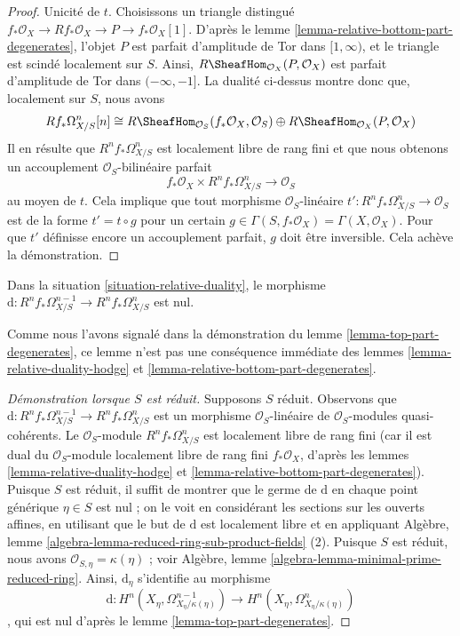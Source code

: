 \begin{proof}
\medskip\noindent
Unicité de $t$. Choisissons un triangle distingué
$f_*\mathcal{O}_X \to Rf_*\mathcal{O}_X \to P \to f_*\mathcal{O}_X[1]$.
D'après le lemme \ref{lemma-relative-bottom-part-degenerates},
l'objet $P$ est parfait d'amplitude de Tor dans $[1, \infty)$,
et le triangle est scindé localement sur $S$.
Ainsi, $R\SheafHom_{\mathcal{O}_X}(P, \mathcal{O}_X)$ est parfait
d'amplitude de Tor dans $(-\infty, -1]$. La dualité ci-dessus montre donc que,
localement sur $S$, nous avons
$$
Rf_*\Omega^n_{X/S}[n] \cong
R\SheafHom_{\mathcal{O}_S}(f_*\mathcal{O}_X, \mathcal{O}_S)
\oplus R\SheafHom_{\mathcal{O}_X}(P, \mathcal{O}_X)
$$
Il en résulte que $R^nf_*\Omega^n_{X/S}$ est localement libre de rang fini et
que nous obtenons un accouplement $\mathcal{O}_S$-bilinéaire parfait
$$
f_*\mathcal{O}_X \times R^nf_*\Omega^n_{X/S} \longrightarrow \mathcal{O}_S
$$
au moyen de $t$.
Cela implique que tout morphisme $\mathcal{O}_S$-linéaire
$t' : R^nf_*\Omega^n_{X/S} \to \mathcal{O}_S$ est de la forme
$t' = t \circ g$ pour un certain
$g \in \Gamma(S, f_*\mathcal{O}_X) = \Gamma(X, \mathcal{O}_X)$.
Pour que $t'$ définisse encore un accouplement parfait, $g$ doit
être inversible. Cela achève la démonstration.
\end{proof}

\begin{lemma}
\label{lemma-relative-top-part-degenerates}
Dans la situation \ref{situation-relative-duality}, le morphisme
$\text{d} : R^nf_*\Omega^{n - 1}_{X/S} \to R^nf_*\Omega^n_{X/S}$
est nul.
\end{lemma}

\noindent
Comme nous l'avons signalé dans la démonstration du lemme \ref{lemma-top-part-degenerates},
ce lemme n'est pas une conséquence immédiate des lemmes
\ref{lemma-relative-duality-hodge} et
\ref{lemma-relative-bottom-part-degenerates}.

\begin{proof}[Démonstration lorsque $S$ est réduit]
Supposons $S$ réduit. Observons que
$\text{d} : R^nf_*\Omega^{n - 1}_{X/S} \to R^nf_*\Omega^n_{X/S}$
est un morphisme $\mathcal{O}_S$-linéaire de $\mathcal{O}_S$-modules quasi-cohérents.
Le $\mathcal{O}_S$-module $R^nf_*\Omega^n_{X/S}$ est localement libre de rang fini
(car il est dual du $\mathcal{O}_S$-module localement libre de rang fini
$f_*\mathcal{O}_X$, d'après les lemmes
\ref{lemma-relative-duality-hodge} et
\ref{lemma-relative-bottom-part-degenerates}).
Puisque $S$ est réduit, il suffit de montrer que
le germe de $\text{d}$ en chaque point générique $\eta \in S$
est nul ; on le voit en considérant les sections sur les ouverts affines,
en utilisant que le but de $\text{d}$ est localement libre et en appliquant
Algèbre, lemme \ref{algebra-lemma-reduced-ring-sub-product-fields} (2).
Puisque $S$ est réduit, nous avons $\mathcal{O}_{S, \eta} = \kappa(\eta)$ ; voir
Algèbre, lemme \ref{algebra-lemma-minimal-prime-reduced-ring}.
Ainsi, $\text{d}_\eta$ s'identifie au morphisme
$$
\text{d} :
H^n(X_\eta, \Omega^{n - 1}_{X_\eta/\kappa(\eta)})
\longrightarrow
H^n(X_\eta, \Omega^n_{X_\eta/\kappa(\eta)})
$$,
qui est nul d'après le lemme \ref{lemma-top-part-degenerates}.
\end{proof}

